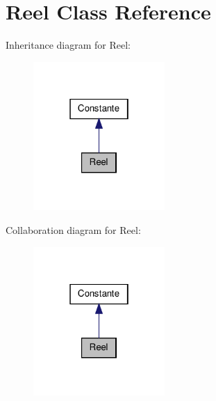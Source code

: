 \hypertarget{class_reel}{\section{\-Reel \-Class \-Reference}
\label{class_reel}
}


\-Inheritance diagram for \-Reel\-:
\nopagebreak
\begin{figure}[H]
\begin{center}
\leavevmode
\includegraphics[width=142pt]{class_reel__inherit__graph}
\end{center}
\end{figure}


\-Collaboration diagram for \-Reel\-:
\nopagebreak
\begin{figure}[H]
\begin{center}
\leavevmode
\includegraphics[width=142pt]{class_reel__coll__graph}
\end{center}
\end{figure}

